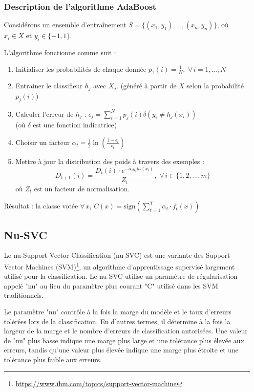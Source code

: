 \subsubsection{Description de l’algorithme AdaBoost}

Considérons un ensemble d’entraînement \( S = \{(x_1, y_1), \ldots, (x_n, y_n)\} \), où \( x_i \in X \) et \( y_i \in \{-1, 1\} \).

L’algorithme fonctionne comme suit :
\begin{enumerate}
    \item Initialiser les probabilités de chaque donnée \( p_1(i) = \frac{1}{N}, \; \forall \, i = 1, \ldots, N \)
    \item Entrainer le classifieur \( h_j \) avec \( X_j \). (généré à partir de \( X \) selon la probabilité \( p_j(i) \))
    \item Calculer l’erreur de \( h_j \) : \( \epsilon_j = \sum_{i=1}^{N} p_j(i) \delta(y_i \neq h_j(x_i)) \) \\
    (où \( \delta \) est une fonction indicatrice)
    \item Choisir un facteur \( \alpha_t = \frac{1}{2} \ln \left( \frac{1 - \epsilon_t}{\epsilon_t} \right) \)
    \item Mettre à jour la distribution des poids à travers des exemples :
    \[
    D_{t+1}(i) = \frac{D_t(i) \cdot e^{-\alpha_t y_i h_t(x_i)}}{Z_t}, \; \forall \, i \in \{1, 2, \ldots, m\}
    \]
    où \( Z_t \) est un facteur de normalisation.
\end{enumerate}

Résultat : la classe votée \( \forall \, x \), \( C(x) = \text{sign} \left( \sum_{t=1}^{T} \alpha_t \cdot f_t(x) \right) \)





\subsection{Nu-SVC}
Le nu-Support Vector Classification (nu-SVC) est une variante des Support Vector Machines (SVM)\footnote{\href{https://www.ibm.com/topics/support-vector-machine} {https://www.ibm.com/topics/support-vector-machine}}, un algorithme d'apprentissage supervisé largement utilisé pour la classification. Le nu-SVC utilise un paramètre de régularisation appelé "nu" au lieu du paramètre plus courant "C" utilisé dans les SVM traditionnels.

Le paramètre "nu" contrôle à la fois la marge du modèle et le taux d'erreurs tolérées lors de la classification. En d'autres termes, il détermine à la fois la largeur de la marge et le nombre d'erreurs de classification autorisées. Une valeur de "nu" plus basse indique une marge plus large et une tolérance plus élevée aux erreurs, tandis qu'une valeur plus élevée indique une marge plus étroite et une tolérance plus faible aux erreurs.

